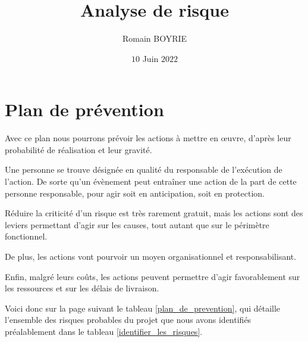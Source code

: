 \documentclass[12pt]{article}
\title{Analyse de risque}
\author{Romain BOYRIE}
\date{$10$ Juin $2022$}
\begin{document}
\maketitle

\setcounter{tocdepth}{2} 

\tableofcontents 

\listoffigures

\listoftables 

\newpage
\section{Plan de prévention}
Avec ce plan nous pourrons prévoir les actions à mettre en œuvre, d’après leur probabilité de réalisation et leur gravité.

Une personne se trouve désignée en qualité du responsable de l’exécution de l’action. De sorte qu’un évènement peut entraîner une action de la part de cette personne responsable, pour agir soit en anticipation, soit en protection.

Réduire la criticité d’un risque est très rarement gratuit, mais les actions sont des leviers permettant d’agir sur les causes, tout autant que sur le périmètre fonctionnel.

De plus, les actions vont pourvoir un moyen organisationnel et responsabilisant.

Enfin, malgré leurs coûts, les actions peuvent permettre d’agir favorablement sur les ressources et sur les délais de livraison. 

Voici donc sur la page suivant le tableau \ref{plan_de_prevention}, qui détaille l’ensemble des risques probables du projet que nous avons identifiés préalablement dans le tableau \ref{identifier_les_risques}.
\end{document}

